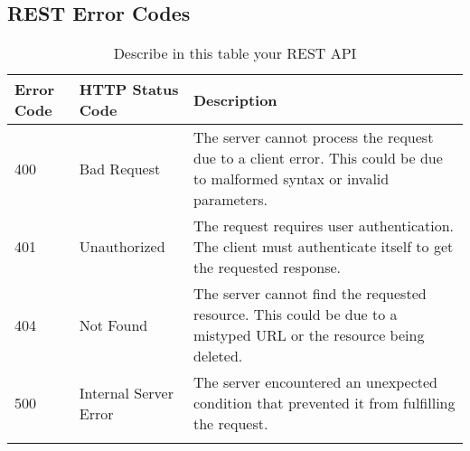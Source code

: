 \subsection{REST Error Codes}


\begin{longtable}{|p{}|p{} |p{}|} 
\hline
\textbf{Error Code} & \textbf{HTTP Status Code} & \textbf{Description} \\\hline
400 & Bad Request & The server cannot process the request due to a client error. This could be due to malformed syntax or invalid parameters. \\\hline
401 & Unauthorized & The request requires user authentication. The client must authenticate itself to get the requested response. \\\hline
404 & Not Found & The server cannot find the requested resource. This could be due to a mistyped URL or the resource being deleted. \\\hline
500 & Internal Server Error & The server encountered an unexpected condition that prevented it from fulfilling the request. \\\hline
\caption{Describe in this table your REST API}
\label{tab:termGlossary}
\end{longtable}